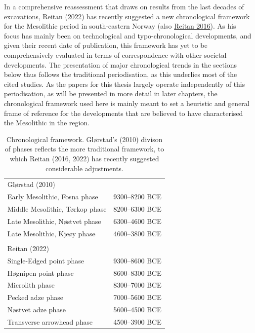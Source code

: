 \documentclass[
  12pt,
  a4paper,
  oneside]{book}
\begin{document}
In a comprehensive reassessment that draws on results from the last decades of excavations, Reitan (\protect\hyperlink{ref-reitan2022}{2022}) has recently suggested a new chronological framework for the Mesolithic period in south-eastern Norway (also \protect\hyperlink{ref-reitan2016}{Reitan 2016}). As his focus has mainly been on technological and typo-chronological developments, and given their recent date of publication, this framework has yet to be comprehensively evaluated in terms of correspondence with other societal developments. The presentation of major chronological trends in the sections below thus follows the traditional periodisation, as this underlies most of the cited studies. As the papers for this thesis largely operate independently of this periodisation, as will be presented in more detail in later chapters, the chronological framework used here is mainly meant to set a heuristic and general frame of reference for the developments that are believed to have characterised the Mesolithic in the region.

\begin{table}

\caption{\label{tab:tab1}Chronological framework. Glørstad's (2010) divison of phases reflects the more traditional framework, to which Reitan (2016, 2022) has recently suggested considerable adjustments.}
\centering
\begin{tabular}[t]{ll}
\toprule
Glørstad (2010) & \\
Early Mesolithic, Fosna phase & 9300–8200 BCE\\
Middle Mesolithic, Tørkop phase & 8200–6300 BCE\\
Late Mesolithic, Nøstvet phase & 6300–4600 BCE\\
Late Mesolithic, Kjeøy phase & 4600–3800 BCE\\
 & \\
Reitan (2022) & \\
Single-Edged point phase & 9300–8600 BCE\\
Høgnipen point phase & 8600–8300 BCE\\
Microlith phase & 8300–7000 BCE\\
Pecked adze phase & 7000–5600 BCE\\
Nøstvet adze phase & 5600–4500 BCE\\
Transverse arrowhead phase & 4500–3900 BCE\\
\bottomrule
\end{tabular}
\end{table}
\end{document}
